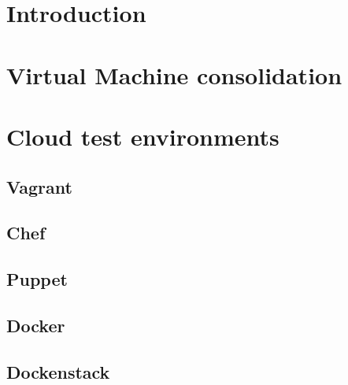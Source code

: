 \section{Introduction}
\label{sec:sota_intro}

\section{Virtual Machine consolidation}
\label{sec:sota_vm_cons}

\section{Cloud test environments}
\label{sec:sota_test_env}

\subsection{Vagrant}
\label{sub:sota_vagrant}

\subsection{Chef}
\label{sub:sota_chef}

\subsection{Puppet}
\label{sub:sota_puppet}

\subsection{Docker}
\label{sub:sota_docker}

\subsection{Dockenstack}
\label{sub:sota_dockenstack}

